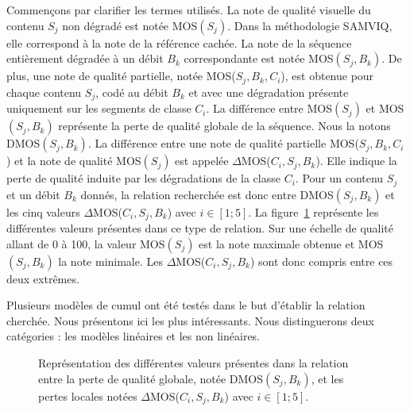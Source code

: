 Commençons par clarifier les termes utilisés. La note de qualité visuelle du contenu $S_j$ non dégradé est notée MOS$(S_j)$. Dans la méthodologie SAMVIQ, elle correspond à la note de la référence cachée. La note de la séquence entièrement dégradée à un débit $B_k$ correspondante est notée MOS$(S_j,B_k)$. De plus, une note de qualité partielle, notée MOS($S_j, B_k, C_i$), est obtenue pour chaque contenu $S_j$, codé au débit $B_k$ et avec une dégradation présente uniquement sur les segments de classe $C_i$. La différence entre MOS$(S_j)$ et MOS$(S_j,B_k)$ représente la perte de qualité globale de la séquence. Nous la notons DMOS$(S_j,B_k)$. La différence entre une note de qualité partielle MOS($S_j, B_k, C_i$) et la note de qualité MOS$(S_j)$ est appelée $\Delta$MOS($C_i, S_j, B_k$). Elle indique la perte de qualité induite par les dégradations de la classe $C_i$. Pour un contenu $S_j$ et un débit $B_k$ donnés, la relation recherchée est donc entre DMOS$(S_j,B_k)$ et les cinq valeurs $\Delta$MOS($C_i, S_j, B_k$) avec $i\in [\text{1};\text{5}]$. La figure~\ref{fig:DMOSDeltaMOS} représente les différentes valeurs présentes dans ce type de relation. Sur une échelle de qualité allant de 0 à 100, la valeur MOS$(S_j)$ est la note maximale obtenue et MOS$(S_j,B_k)$ la note minimale. Les $\Delta$MOS($C_i, S_j, B_k$) sont donc compris entre ces deux extrêmes.

Plusieurs modèles de cumul ont été testés dans le but d'établir la relation cherchée. Nous présentons ici les plus intéressants. Nous distinguerons deux catégories : les modèles linéaires et les non linéaires.

\begin{figure}[htbp]
	\centering
	\begin{tikzpicture}[yscale=1.5]\end{tikzpicture}
	\caption{Représentation des différentes valeurs présentes dans la relation entre la perte de qualité globale, notée DMOS$(S_j,B_k)$, et les pertes locales notées $\Delta$MOS($C_i, S_j, B_k$) avec $i\in [\text{1};\text{5}]$.}
	\label{fig:DMOSDeltaMOS}
\end{figure}


